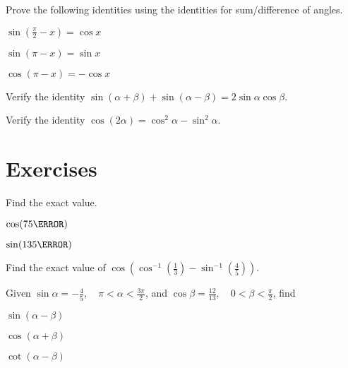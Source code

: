 \begin{example}
  Prove the following identities using the identities for sum/difference of angles.
  \begin{enumerate*}
    \item $\sin(\frac{\pi}{2}-x)=\cos x$
    \item $\sin(\pi - x)=\sin x$
    \item $\cos(\pi - x)=-\cos x$\hfill\null
  \end{enumerate*}
\end{example}

\newpage

\begin{example}
  Verify the identity $\sin(\alpha+\beta)+\sin(\alpha-\beta)=2\sin \alpha \cos \beta$.
\end{example}

\begin{example}
  Verify the identity $\cos(2\alpha)=\cos^2\alpha-\sin^2\alpha$.
\end{example}

\newpage
\section*{Exercises}
\begin{exercise}
  Find the exact value.\\
  \begin{enumerate*}
    \item $\cos(75\degree)$
    \item $\sin(135\degree)$\hfill\null
  \end{enumerate*}
\end{exercise}

\begin{exercise}
  Find the exact value of $\cos\left(\cos^{-1}\left(\frac{1}{3}\right) - \sin^{-1}\left(\frac45\right)\right)$.
\end{exercise}

\begin{exercise}
  Given $\sin \alpha=-\frac{4}{5}, \quad \pi<\alpha<\frac{3\pi}{2}$, and $\cos \beta=\frac{12}{13}, \quad 0<\beta<\frac{\pi}{2}$, find\\
  \begin{enumerate*}
    \item $\sin(\alpha-\beta)$
    \item $\cos(\alpha+\beta)$
    \item $\cot(\alpha-\beta)$\hfill\null
  \end{enumerate*}
\end{exercise}

